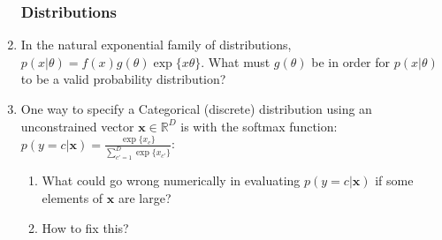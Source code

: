 \documentclass[12pt]{article}
\newcommand{\vx}{{\mathbf{x}}}
\begin{document}
\begin{enumerate}
\subsubsection*{Distributions}
\item In the natural exponential family of distributions, $p(x|\theta) = f(x)g(\theta)\exp\{x\theta\}$.
What must $g(\theta)$ be in order for $p(x | \theta)$ to be a valid probability distribution?\vspace{0.5cm}
\item One way to specify a Categorical (discrete) distribution using an unconstrained vector $\vx \in \mathbb{R}^D$ is with the softmax function: $p(y = c | \vx) = \frac{\exp\{x_c\}}{\sum_{c'=1}^D \exp\{x_{c'}\}}$:
\begin{enumerate}
\item What could go wrong numerically in evaluating $p(y = c | \vx)$ if some elements of $\vx$ are large?\vspace{0.5cm}
\item How to fix this?
\end{enumerate}
\end{enumerate}
\end{document}
